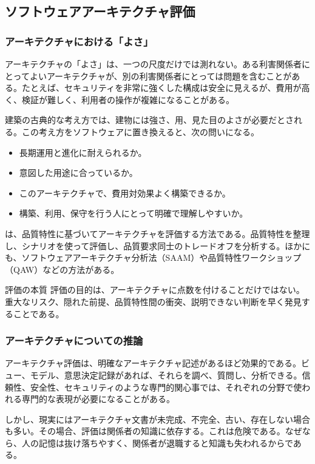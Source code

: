 \documentclass[a4paper,11pt]{ltjsarticle}
\numberwithin{figure}{section}
\numberwithin{table}{section}
\newcommand{\en}[1]{（#1）}
\begin{document}
\subsection{ソフトウェアアーキテクチャ評価}

\subsubsection{アーキテクチャにおける「よさ」}
アーキテクチャの「よさ」は、一つの尺度だけでは測れない。ある利害関係者にとってよいアーキテクチャが、別の利害関係者にとっては問題を含むことがある。たとえば、セキュリティを非常に強くした構成は安全に見えるが、費用が高く、検証が難しく、利用者の操作が複雑になることがある。

建築の古典的な考え方では、建物には強さ、用、見た目のよさが必要だとされる。この考え方をソフトウェアに置き換えると、次の問いになる。
\begin{itemize}
  \item 長期運用と進化に耐えられるか。
  \item 意図した用途に合っているか。
  \item このアーキテクチャで、費用対効果よく構築できるか。
  \item 構築、利用、保守を行う人にとって明確で理解しやすいか。
\end{itemize}

は、品質特性に基づいてアーキテクチャを評価する方法である。品質特性を整理し、シナリオを使って評価し、品質要求同士のトレードオフを分析する。ほかにも、ソフトウェアアーキテクチャ分析法\en{SAAM}や品質特性ワークショップ\en{QAW}などの方法がある。

\begin{statementbox}{評価の本質}
評価の目的は、アーキテクチャに点数を付けることだけではない。重大なリスク、隠れた前提、品質特性間の衝突、説明できない判断を早く発見することである。
\end{statementbox}

\subsubsection{アーキテクチャについての推論}
アーキテクチャ評価は、明確なアーキテクチャ記述があるほど効果的である。ビュー、モデル、意思決定記録があれば、それらを調べ、質問し、分析できる。信頼性、安全性、セキュリティのような専門的関心事では、それぞれの分野で使われる専門的な表現が必要になることがある。

しかし、現実にはアーキテクチャ文書が未完成、不完全、古い、存在しない場合も多い。その場合、評価は関係者の知識に依存する。これは危険である。なぜなら、人の記憶は抜け落ちやすく、関係者が退職すると知識も失われるからである。
\end{document}
